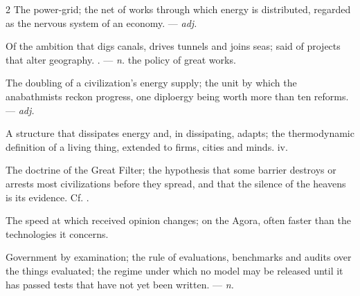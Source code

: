 \begin{multicols}{2}
 The power-grid; the net of works through which energy is distributed, regarded as the nervous system of an economy.  —  \textit{adj.}

 Of the ambition that digs canals, drives tunnels and joins seas; said of projects that alter geography. . —  \textit{n.} the policy of great works.

 The doubling of a civilization's energy supply; the unit by which the anabathmists reckon progress, one diploergy being worth more than ten reforms.  —  \textit{adj.}

 A structure that dissipates energy and, in dissipating, adapts; the thermodynamic definition of a living thing, extended to firms, cities and minds.   iv.

 The doctrine of the Great Filter; the hypothesis that some barrier destroys or arrests most civilizations before they spread, and that the silence of the heavens is its evidence.  Cf. .

 The speed at which received opinion changes; on the Agora, often faster than the technologies it concerns. 

 Government by examination;  the rule of evaluations, benchmarks and audits over the things evaluated;   the regime under which no model may be released until it has passed tests that have not yet been written.   —  \textit{n.}


\end{multicols}

